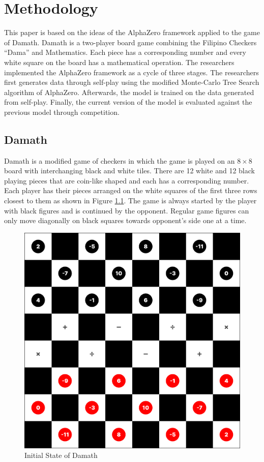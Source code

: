 \chapter{Methodology}

This paper is based on the ideas of the AlphaZero framework applied to the game of Damath. Damath is a two-player board game combining the Filipino Checkers ``Dama'' and Mathematics. Each piece has a corresponding number and every  white square on the board has a mathematical operation. The researchers implemented the AlphaZero framework as a cycle of three stages. The researchers first generates data through self-play using the modified Monte-Carlo Tree Search algorithm of AlphaZero. Afterwards, the model is trained on the data generated from self-play. Finally, the current version of the model is evaluated against the previous model through competition.

\section{Damath}

Damath is a modified game of checkers in which the game is played on an $8 \times 8$ board with interchanging black and white tiles. There are 12 white and 12 black playing pieces that are coin-like shaped and each has a corresponding number. Each player has their pieces arranged on the white squares of the first three rows closest to them as shown in Figure \ref{fig:initial_state}. The game is always started by the player with black figures and is continued by the opponent. Regular game figures can only move diagonally on black squares towards opponent's side one at a time.

\begin{figure}
    \centering
    \includegraphics[width=0.5\linewidth]{images/initial_state.png}
    \caption{Initial State of Damath}
    \label{fig:initial_state}
\end{figure}

